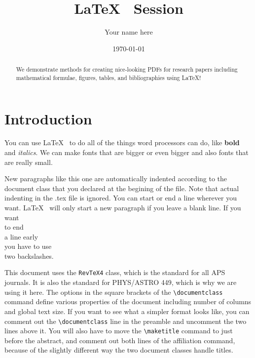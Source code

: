 \documentclass[twocolumn,10 pt,showpacs,preprintnumbers,amsmath,amssymb]{revtex4-1}
\begin{document}
\title{\LaTeX~ Session}

\author{Your name here}

\date{\today}

\begin{abstract}
  We demonstrate methods for creating nice-looking PDFs for research
  papers including mathematical formulae, figures, tables, and
  bibliographies using \LaTeX!
\end{abstract}

\maketitle

\section{Introduction}

You can use \LaTeX~ to do all of the things word processors can do, like
\textbf{bold} and \textit{italics}. We can make fonts that are {\Large
bigger} or even {\Huge bigger} and also fonts that are really {\tiny 
small}.

New paragraphs like this one are automatically indented according to the
document class that you declared at the begining of the file. Note that
actual indenting in the .tex file is ignored. You can start or end a
line wherever you want. \LaTeX~ will only start a new paragraph if you
leave a blank line. If you want\\ to end\\ a line early\\ you have to
use\\ two backslashes.

This document uses the \texttt{Rev\TeX 4} class, which is the standard for
all APS journals. It is also the standard for PHYS/ASTRO 449, which is
why we are using it here. The options in the square brackets of the
\verb_\documentclass_ command define various properties of the document
including number of columns and global text size. If you want to see
what a simpler format looks like, you can comment out the
\verb_\documentclass_ line in the preamble and uncomment the two lines
above it. You will also have to move the \verb_\maketitle_ command to
just before the abstract, and comment out both lines of the affiliation
command, because of the slightly different way the two document classes
handle titles.
\end{document}
